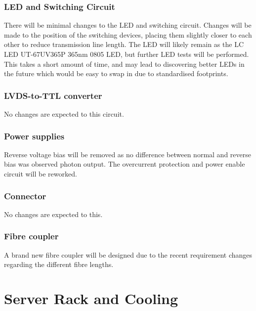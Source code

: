 \documentclass[a4paper,11pt]{article}
\begin{document}
\subsubsection{LED and Switching Circuit}

There will be minimal changes to the LED and switching circuit. Changes will be made to the position of the switching devices, placing them slightly closer to each other to reduce transmission line length. The LED will likely remain as the LC LED UT-67UV365P 365nm 0805 LED, but further LED tests will be performed. This takes a short amount of time, and may lead to discovering better LEDs in the future which would be easy to swap in due to standardised footprints.

\subsubsection{LVDS-to-TTL converter}

No changes are expected to this circuit.

\subsubsection{Power supplies}

Reverse voltage bias will be removed as no difference between normal and reverse bias was observed photon output. The overcurrent protection and power enable circuit will be reworked.

\subsubsection{Connector}

No changes are expected to this.

\subsubsection{Fibre coupler}

A brand new fibre coupler will be designed due to the recent requirement changes regarding the different fibre lengths.


\section{Server Rack and Cooling}
\end{document}
